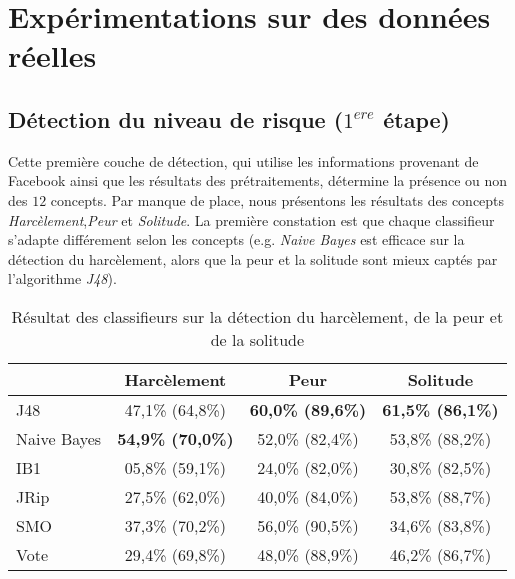 \section{Expérimentations sur des données réelles}\label{expe}

\subsection{Détection du niveau de risque ($1^{ere}$ étape)}

Cette première couche de détection, qui utilise les informations provenant de Facebook ainsi que les résultats des prétraitements, détermine la présence ou non des $12$ concepts. Par manque de place, nous présentons les résultats des concepts \emph{Harcèlement},\emph{Peur} et \emph{Solitude}.
La première constation est que chaque classifieur s'adapte différement selon les concepts (e.g. \emph{Naive Bayes} est efficace sur la détection du harcèlement, alors que la peur et la solitude sont mieux captés par l'algorithme \emph{J48}). 

\begin{table}[htb]
\center\small
\begin{tabular*}{\linewidth}{@{\extracolsep{\fill}}lccc}
\hline\hline
& Harcèlement & Peur & Solitude\\
\hline
J48
& 47,1\% \footnotesize{(64,8\%)} &  \textbf{60,0\% \footnotesize{(89,6\%)}} &  \textbf{61,5\% \footnotesize{(86,1\%)}} \\
Naive Bayes
& \textbf{54,9\% \footnotesize{(70,0\%)}} & 52,0\% \footnotesize{(82,4\%)} & 53,8\% \footnotesize{(88,2\%)} \\
IB1
& 05,8\% \footnotesize{(59,1\%)} & 24,0\% \footnotesize{(82,0\%)} & 30,8\% \footnotesize{(82,5\%)} \\
JRip
& 27,5\% \footnotesize{(62,0\%)} & 40,0\% \footnotesize{(84,0\%)} & 53,8\% \footnotesize{(88,7\%)} \\
SMO 
& 37,3\% \footnotesize{(70,2\%)} & 56,0\% \footnotesize{(90,5\%)} & 34,6\% \footnotesize{(83,8\%)} \\
Vote 
& 29,4\% \footnotesize{(69,8\%)} & 48,0\% \footnotesize{(88,9\%)} & 46,2\% \footnotesize{(86,7\%)} \\
\hline
\end{tabular*}
\caption{Résultat des classifieurs sur la détection du harcèlement, de la peur et de la solitude}
\label{tab_precision_concept}
\end{table}

